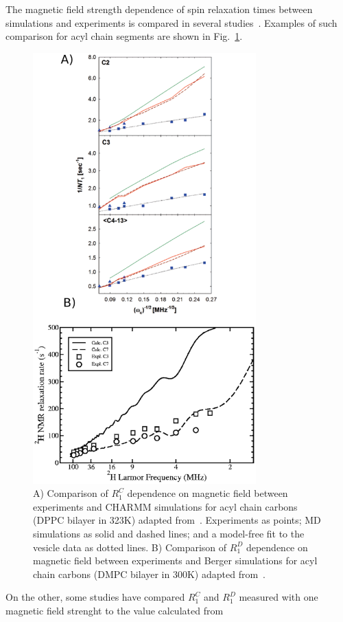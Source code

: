 \documentclass[aps,prl,superscriptaddress,twocolumn]{revtex4}
\begin{document}
The magnetic field strength dependence of spin relaxation times between simulations and
experiments is compared in several studies~\cite{pastor88,lindahl01,pastor02,klauda08a,klauda08b,wohlert06}. 
Examples of such comparison for acyl chain segments are shown in Fig.~\ref{Rdispersion}.
\begin{figure}[]
  \includegraphics[width=8.6cm]{../Fig/Rdispersion.eps}
\newline
  \caption{\label{Rdispersion}
    A) Comparison of $R_1^{C}$ dependence on magnetic field between experiments and CHARMM simulations for acyl chain carbons (DPPC bilayer in 323K) adapted from~\cite{klauda08a}.
    Experiments as points; MD simulations as solid and dashed lines; and a model-free fit to the vesicle data as dotted lines. 
    B) Comparison of $R_1^{D}$ dependence on magnetic field between experiments and Berger simulations for acyl chain carbons (DMPC bilayer in 300K) adapted from~\cite{wohlert06}.
  } 
\end{figure}
On the other, some studies have compared $R_1^{C}$ and $R_1^{D}$ measured with one magnetic field strenght to the value calculated from
\end{document}
